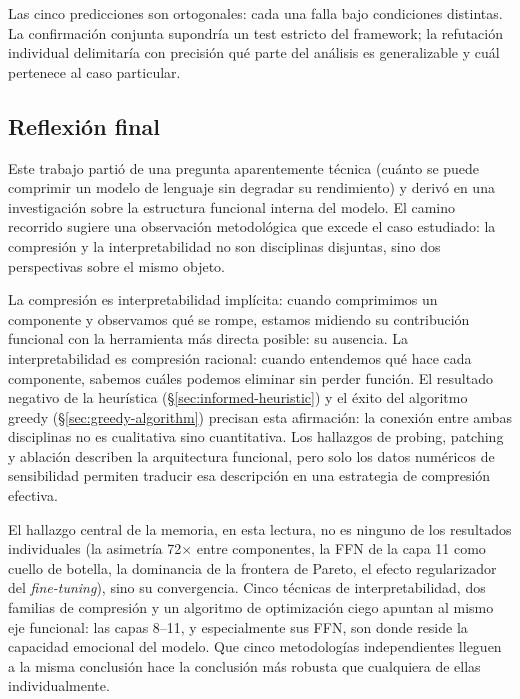 Las cinco predicciones son ortogonales: cada una falla bajo condiciones
distintas. La confirmación conjunta supondría un test estricto del
framework; la refutación individual delimitaría con precisión qué parte
del análisis es generalizable y cuál pertenece al caso particular.


\subsection{Reflexión final}
\label{sec:reflexion-final}

Este trabajo partió de una pregunta aparentemente técnica (cuánto se puede
comprimir un modelo de lenguaje sin degradar su rendimiento) y derivó en
una investigación sobre la estructura funcional interna del modelo. El
camino recorrido sugiere una observación metodológica que excede el caso
estudiado: la compresión y la interpretabilidad no son disciplinas
disjuntas, sino dos perspectivas sobre el mismo objeto.

La compresión es interpretabilidad implícita: cuando comprimimos un
componente y observamos qué se rompe, estamos midiendo su contribución
funcional con la herramienta más directa posible: su ausencia. La
interpretabilidad es compresión racional: cuando entendemos qué hace cada
componente, sabemos cuáles podemos eliminar sin perder función. El
resultado negativo de la heurística (\S\ref{sec:informed-heuristic}) y el
éxito del algoritmo greedy (\S\ref{sec:greedy-algorithm}) precisan esta
afirmación: la conexión entre ambas disciplinas no es cualitativa sino
cuantitativa. Los hallazgos de probing, patching y ablación describen la
arquitectura funcional, pero solo los datos numéricos de sensibilidad
permiten traducir esa descripción en una estrategia de compresión efectiva.

El hallazgo central de la memoria, en esta lectura, no es ninguno de los
resultados individuales (la asimetría 72$\times$ entre componentes, la FFN
de la capa 11 como cuello de botella, la dominancia de la frontera de
Pareto, el efecto regularizador del \emph{fine-tuning}), sino su convergencia.
Cinco técnicas de interpretabilidad, dos familias de compresión y un
algoritmo de optimización ciego apuntan al mismo eje funcional: las capas
8--11, y especialmente sus FFN, son donde reside la capacidad emocional del
modelo. Que cinco metodologías independientes lleguen a la misma conclusión
hace la conclusión más robusta que cualquiera de ellas individualmente.

